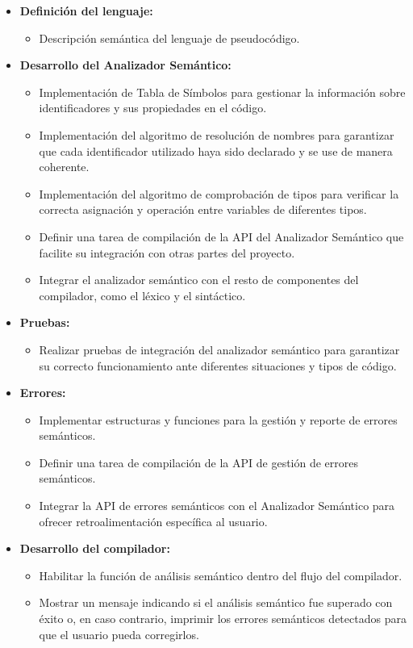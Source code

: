 \begin{itemize}
    \item \textbf{Definición del lenguaje:}
    \begin{itemize}
        \item Descripción semántica del lenguaje de pseudocódigo.
    \end{itemize}
    
    \item \textbf{Desarrollo del Analizador Semántico:}
    \begin{itemize}
        \item Implementación de Tabla de Símbolos para gestionar la información sobre identificadores y sus propiedades en el código.
        \item Implementación del algoritmo de resolución de nombres para garantizar que cada identificador utilizado haya sido declarado y se use de manera coherente.
        \item Implementación del algoritmo de comprobación de tipos para verificar la correcta asignación y operación entre variables de diferentes tipos.
        \item Definir una tarea de compilación de la API del Analizador Semántico que facilite su integración con otras partes del proyecto.
        \item Integrar el analizador semántico con el resto de componentes del compilador, como el léxico y el sintáctico.
    \end{itemize}

    \item \textbf{Pruebas:}
    \begin{itemize}
        \item Realizar pruebas de integración del analizador semántico para garantizar su correcto funcionamiento ante diferentes situaciones y tipos de código.
    \end{itemize}

    \item \textbf{Errores:}
    \begin{itemize}
        \item Implementar estructuras y funciones para la gestión y reporte de errores semánticos.
        \item Definir una tarea de compilación de la API de gestión de errores semánticos.
        \item Integrar la API de errores semánticos con el Analizador Semántico para ofrecer retroalimentación específica al usuario.
    \end{itemize}

    \item \textbf{Desarrollo del compilador:}
    \begin{itemize}
        \item Habilitar la función de análisis semántico dentro del flujo del compilador.
        \item Mostrar un mensaje indicando si el análisis semántico fue superado con éxito o, en caso contrario, imprimir los errores semánticos detectados para que el usuario pueda corregirlos.
    \end{itemize}
\end{itemize}

